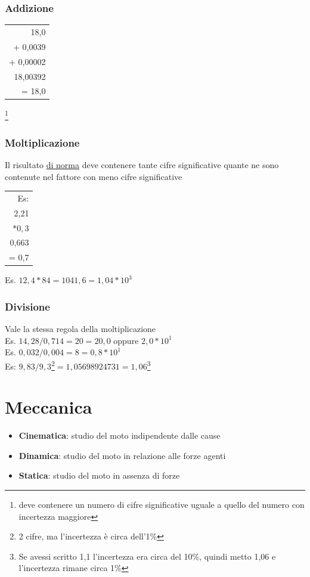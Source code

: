 \documentclass{report}
\begin{document}
\subsubsection{Addizione}
\begin{center}

  \begin{tabular}{r}
    18,0      \\
    + 0,0039  \\
    + 0,00002 \\
    \hline
    18,00392  \\
    = 18,0
  \end{tabular}

\end{center}\footnote{deve contenere un numero di cifre significative uguale a quello del numero con incertezza maggiore}

\subsubsection{Moltiplicazione}
Il risultato \underline{di norma} deve contenere tante cifre significative quante ne sono contenute nel fattore con meno cifre significative
\begin{center}

  \begin{tabular}{r}
    Es:     \\
    2,21    \\
    $* 0,3$ \\
    \hline
    0,663   \\
    = 0,7
  \end{tabular}
\end{center}
Es. $12,4*84=1041,6=1,04*10^{3}$
\subsubsection{Divisione}
Vale la stessa regola della moltiplicazione\\
Es. $14,28/0,714=20=20,0$ oppure $2,0*10^{1}$\\
Es. $0,032/0,004=8=0,8*10^{1}$\\
Es: $9,83/9,3$\footnote{2 cifre, ma l'incertezza è circa dell'1\%}$=1,05698924731=1,06$\footnote{Se avessi scritto 1,1 l'incertezza era circa del 10\%, quindi metto 1,06 e l'incertezza rimane circa 1\%}\\
\section{Meccanica}
\begin{itemize}
  \item \textbf{Cinematica}: studio del moto indipendente dalle cause
  \item \textbf{Dinamica}: studio del moto in relazione alle forze agenti
  \item \textbf{Statica}: studio del moto in assenza di forze
\end{itemize}
\end{document}
